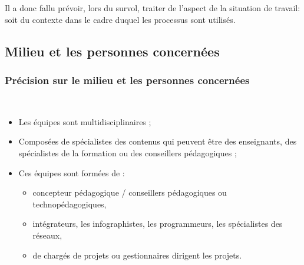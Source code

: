 \begin{frame}[allowframebreaks]
			\par  Il a donc fallu prévoir, lors du survol, traiter de l’aspect de la situation de travail: soit du contexte dans le cadre duquel les processus sont utilisés.
                \end{frame}

\subsection{Milieu et les personnes concernées} 
		\begin{frame}[allowframebreaks]
			\frametitle{Précision sur le milieu et les personnes concernées}
                        \
                        \begin{itemize} 
                        \item  Les équipes sont multidisciplinaires ;
                        \item Composées de spécialistes des contenus qui peuvent être des enseignants, des spécialistes de la formation ou des conseillers pédagogiques ;
                        \item Ces équipes sont formées de : 
                        	\begin{itemize}
                        		\item concepteur pédagogique / conseillers pédagogiques ou technopédagogiques,
                        		\item intégrateurs, les infographistes, les programmeurs, les spécialistes des réseaux,
                        		\item de chargés de projets ou gestionnaires dirigent les projets.
                        	\end{itemize}

                        \end{itemize}

             
                \end{frame}

